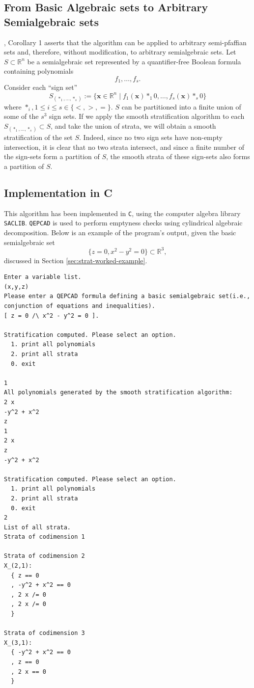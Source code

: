 \documentclass[
]{book}
\theoremstyle{definition}
\theoremstyle{definition}
\theoremstyle{definition}
\theoremstyle{definition}
\theoremstyle{remark}
\begin{document}
\hypertarget{sec:strat-semialgebraic}{%
\subsection{From Basic Algebraic sets to Arbitrary Semialgebraic sets}\label{sec:strat-semialgebraic}}

\citet{gv1995}, Corollary 1 asserts that the algorithm can be applied to arbitrary semi-pfaffian sets and, therefore, without modification, to arbitrary semialgebraic sets.
Let \(S \subset \mathbb{R}^n\) be a semialgebraic set represented by a quantifier-free Boolean formula containing polynomials
\[
f_1,\ldots,f_s.
\]
Consider each ``sign set''
\[
S_{( \ast_1,\ldots,\ast_s )} := \{ \mathbf{x} \in \mathbb{R}^n \mid f_1(\mathbf{x}) \ast_1 0, \ldots, f_s(\mathbf{x}) \ast_s 0 \}
\]
where \(\ast_i, 1 \le i \le s \in \{<, >, =\}\). \(S\) can be partitioned into a finite union of some of the \(s^3\) sign sets.
If we apply the smooth stratification algorithm to each \(S_{(\ast_1,\ldots,\ast_s)} \subset S\), and take the union of strata, we will obtain a smooth stratification of the set \(S\). Indeed, since no two sign sets have non-empty intersection, it is clear that no two strata intersect, and since a finite number of the sign-sets form a partition of \(S\), the smooth strata of these sign-sets also forms a partition of \(S\).

\hypertarget{implementation-in-c}{%
\subsection{Implementation in C}\label{implementation-in-c}}

This algorithm has been implemented in \texttt{C}, using the computer algebra library \texttt{SACLIB}. \texttt{QEPCAD} is used to perform emptyness checks using cylindrical algebraic decomposition. Below is an example of the program's output, given the basic semialgebraic set
\[
\{ z = 0, x^2 - y^2 = 0 \} \subset \mathbb{R}^3,
\]
discussed in Section \ref{sec:strat-worked-example}.

\begin{verbatim}
Enter a variable list.
(x,y,z)
Please enter a QEPCAD formula defining a basic semialgebraic set(i.e., conjunction of equations and inequalities).
[ z = 0 /\ x^2 - y^2 = 0 ].

Stratification computed. Please select an option.
  1. print all polynomials
  2. print all strata
  0. exit

1
All polynomials generated by the smooth stratification algorithm:
2 x
-y^2 + x^2
z
1
2 x
z
-y^2 + x^2

Stratification computed. Please select an option.
  1. print all polynomials
  2. print all strata
  0. exit
2
List of all strata.
Strata of codimension 1

Strata of codimension 2
X_(2,1):
  { z == 0
  , -y^2 + x^2 == 0
  , 2 x /= 0
  , 2 x /= 0
  }

Strata of codimension 3
X_(3,1):
  { -y^2 + x^2 == 0
  , z == 0
  , 2 x == 0
  }
\end{verbatim}
\end{document}
